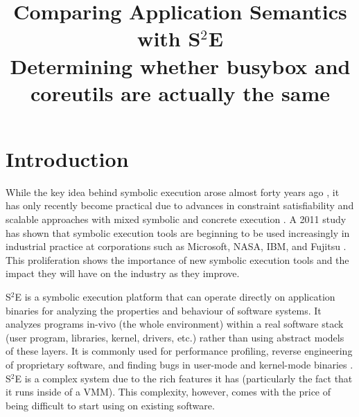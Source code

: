 \documentclass[conference]{IEEEtran}
\begin{document}

\title{Comparing Application Semantics with S$^2$E \\ {\large Determining whether busybox and coreutils are actually the same}}

\author{
\and
{}
}

\maketitle


\section{Introduction}

While the key idea behind symbolic execution arose almost forty
years ago \cite{select}, it has only recently become practical due to
advances in constraint satisfiability \cite{satisfiability} and scalable approaches
with mixed symbolic and concrete execution \cite{systems-crash, dart}.
A 2011 study has shown that symbolic execution tools are beginning to
be used increasingly in industrial practice at corporations such as Microsoft,
NASA, IBM, and Fujitsu \cite{symb-ex-practice}. This proliferation shows the
importance of new symbolic execution tools and the impact they will have
on the industry as they improve.

S$^2$E is a symbolic execution platform that can operate directly on application
binaries for analyzing the properties and behaviour of software systems. It
analyzes programs in-vivo (the whole environment) within a real software stack
(user program, libraries, kernel, drivers, etc.) rather than using abstract models
of these layers. It is commonly used for performance profiling, reverse engineering
of proprietary software, and finding bugs in user-mode and kernel-mode
binaries \cite{s2e}. S$^2$E is a complex system due to the rich features it has
(particularly the fact that it runs inside of a VMM). This complexity, however, comes
with the price of being difficult to start using on existing software.
\end{document}
